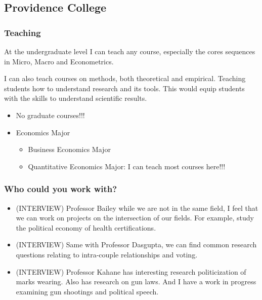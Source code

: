 \documentclass[12pt]{article}
\theoremstyle{plain}
\theoremstyle{plain}
\theoremstyle{plain}
\theoremstyle{plain}
\theoremstyle{plain}
\theoremstyle{plain}
\begin{document}
\subsection{Providence College}
\label{sec:orgf98917f}

\subsubsection{Teaching}
\label{sec:orgc3cebf3}
At the undergraduate level I can teach any course, especially the cores sequences in Micro, Macro and Econometrics.

I can also teach courses on methods, both theoretical and empirical.
Teaching students how to understand research and its tools.
This would equip students with the skills to understand scientific results.

\begin{itemize}
\item No graduate courses!!!
\item Economics Major
\begin{itemize}
\item Business Economics Major
\item Quantitative Economics Major: I can teach most courses here!!!
\end{itemize}
\end{itemize}

\subsubsection{Who could you work with?}
\label{sec:org60ca886}
\begin{itemize}
\item (INTERVIEW) Professor Bailey while we are not in the same field, I feel that we can work on
projects on the intersection of our fields. For example, study the political economy of health certifications.
\item (INTERVIEW) Same with Professor Dasgupta, we can find common research questions relating to intra-couple relationships and voting.
\item (INTERVIEW) Professor Kahane has interesting research politicization of marks wearing.
Also has research on gun laws.
And I have a work in progress examining gun shootings and political speech.
\end{itemize}
\end{document}
